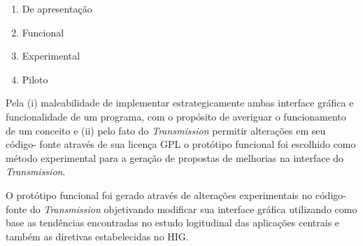 \begin{enumerate}
  \item De apresentação
  \item Funcional
  \item Experimental
  \item Piloto
\end{enumerate}

Pela (i) maleabilidade de implementar estrategicamente ambas interface gráfica e
funcionalidade de um programa, com o propósito de averiguar o funcionamento de
um conceito e (ii) pelo fato do \textit{Transmission} permitir alterações em seu
código- fonte através de sua licença GPL o protótipo funcional foi escolhido
como método experimental para a geração de propostas de melhorias na interface
do \textit{Transmission}.

O protótipo funcional foi gerado através de alterações experimentais no código-
fonte do \textit{Transmission} objetivando modificar sua interface gráfica
utilizando como base as tendências encontradas no estudo logitudinal das
aplicações centrais e também as diretivas estabelecidas no HIG.
